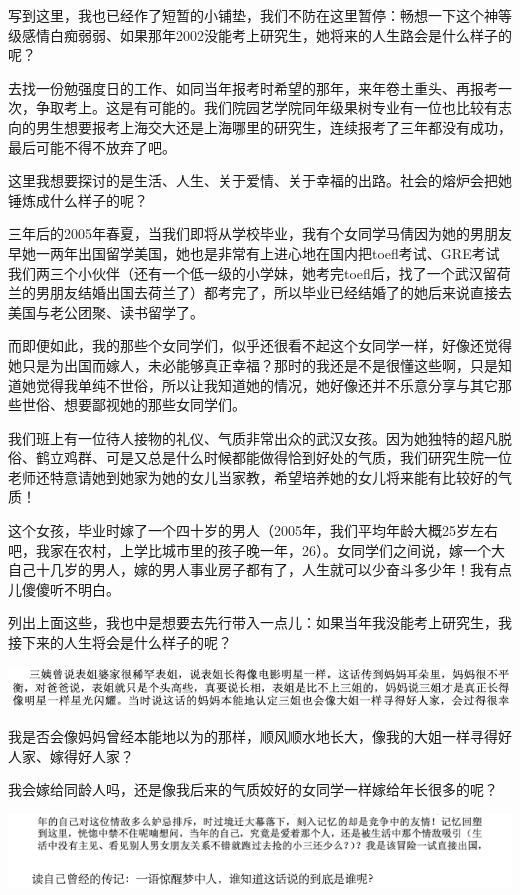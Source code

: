 \documentclass[9pt, b5paper]{article}
\begin{document}
写到这里，我也已经作了短暂的小铺垫，我们不防在这里暂停：畅想一下这个神等级感情白痴弱弱、如果那年2002没能考上研究生，她将来的人生路会是什么样子的呢？

去找一份勉强度日的工作、如同当年报考时希望的那年，来年卷土重头、再报考一次，争取考上。这是有可能的。我们院园艺学院同年级果树专业有一位也比较有志向的男生想要报考上海交大还是上海哪里的研究生，连续报考了三年都没有成功，最后可能不得不放弃了吧。

这里我想要探讨的是生活、人生、关于爱情、关于幸福的出路。社会的熔炉会把她锤炼成什么样子的呢？ 

三年后的2005年春夏，当我们即将从学校毕业，我有个女同学马倩因为她的男朋友早她一两年出国留学美国，她也是非常有上进心地在国内把toefl考试、GRE考试我们两三个小伙伴（还有一个低一级的小学妹，她考完toefl后，找了一个武汉留荷兰的男朋友结婚出国去荷兰了）都考完了，所以毕业已经结婚了的她后来说直接去美国与老公团聚、读书留学了。 

而即便如此，我的那些个女同学们，似乎还很看不起这个女同学一样，好像还觉得她只是为出国而嫁人，未必能够真正幸福？那时的我还是不是很懂这些啊，只是知道她觉得我单纯不世俗，所以让我知道她的情况，她好像还并不乐意分享与其它那些世俗、想要鄙视她的那些女同学们。 

我们班上有一位待人接物的礼仪、气质非常出众的武汉女孩。因为她独特的超凡脱俗、鹤立鸡群、可是又总是什么时候都能做得恰到好处的气质，我们研究生院一位老师还特意请她到她家为她的女儿当家教，希望培养她的女儿将来能有比较好的气质！

这个女孩，毕业时嫁了一个四十岁的男人（2005年，我们平均年龄大概25岁左右吧，我家在农村，上学比城市里的孩子晚一年，26）。女同学们之间说，嫁一个大自己十几岁的男人，嫁的男人事业房子都有了，人生就可以少奋斗多少年！我有点儿傻傻听不明白。 

列出上面这些，我也中是想要去先行带入一点儿：如果当年我没能考上研究生，我接下来的人生将会是什么样子的呢？

\begin{center}
\includegraphics[width=.9\linewidth]{./pic/backups_plans_20210422_095219.png}
\end{center}

我是否会像妈妈曾经本能地以为的那样，顺风顺水地长大，像我的大姐一样寻得好人家、嫁得好人家？

我会嫁给同龄人吗，还是像我后来的气质姣好的女同学一样嫁给年长很多的呢？

\begin{center}
\includegraphics[width=.9\linewidth]{./pic/backups_plans_20210503_111522.png}
\end{center}
\end{document}
